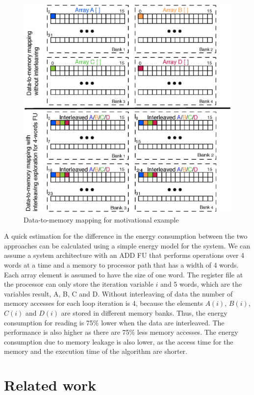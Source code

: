 \documentclass[prodmode,acmtodaes]{acmsmall}
\begin{document}
\begin{figure}
\centering
	\label{motivation}
	\caption{Data-to-memory mapping for motivational example}
	\includegraphics[scale = 0.5]{Images/motivation.eps}
\end{figure}

A quick estimation for the difference in the energy consumption between the two approaches can be calculated using a simple energy model for the system.
We can assume a system architecture with an ADD FU that performs operations over 4 words at a time and a memory to processor path that has a width of 4 words. 
Each array element is assumed to have the size of one word.
The register file at the processor can only store the iteration variable $i$ and 5 words, which are the variables result, A, B, C and D.
Without interleaving of data the number of memory accesses for each loop iteration is 4, because the elements $A(i)$, $B(i)$, $C(i)$ and $D(i)$ are stored in different memory banks.
Thus, the energy consumption for reading is 75\% lower when the data are interleaved.
The performance is also higher as there are 75\% less memory accesses.
The energy consumption due to memory leakage is also lower, as the access time for the memory and the execution time of the algorithm are shorter.

\section{Related work}
\end{document}
